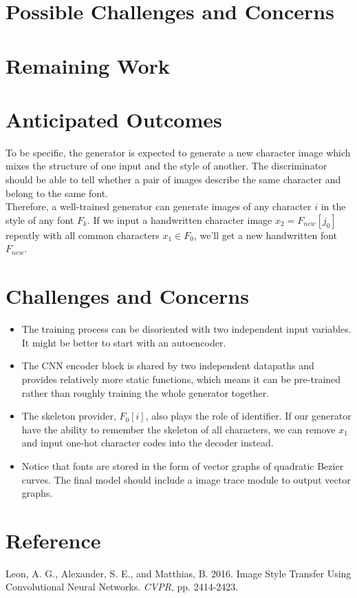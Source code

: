 \documentclass[letterpaper]{article}
\begin{document}
\section{Possible Challenges and Concerns}

\section{Remaining Work}

\section{Anticipated Outcomes}
To be specific, the generator is expected to generate a new character image which mixes the structure of one input and the style of another. The discriminator should be able to tell whether a pair of images describe the same character and belong to the same font.
\\
Therefore, a well-trained generator can generate images of any character $i$ in the style of any font $F_k$. If we input a handwritten character image $x_2=F_{new}[j_0]$ repeatly with all common characters $x_1\in F_0$, we'll get a new handwritten font $F_{new}$.

\section{Challenges and Concerns}
\begin{itemize}
    \item The training process can be disoriented with two independent input variables. It might be better to start with an autoencoder.
    \item The CNN encoder block is shared by two independent datapaths and provides relatively more static functions, which means it can be pre-trained rather than roughly training the whole generator together.
    \item The skeleton provider, $F_0[i]$, also plays the role of identifier. If our generator have the ability to remember the skeleton of all characters, we can remove $x_1$ and input one-hot character codes into the decoder instead.
    \item Notice that fonts are stored in the form of vector graphs of quadratic Bezier curves. The final model should include a image trace module to output vector graphs.
\end{itemize}

\section{Reference}
\smallskip \noindent
Leon, A. G., Alexander, S. E., and Matthias, B. 2016. Image Style Transfer Using Convolutional Neural Networks. \textit{CVPR}, pp. 2414-2423.
\end{document}
